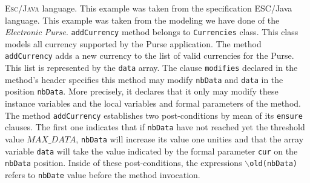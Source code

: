 \documentclass[a4paper]{llncs}
\begin{document}







\textsc{Esc/Java} language. This example was taken from the
specification ESC/Java language. This example was taken from the
modeling we have done of the \textit{Electronic
Purse}. \texttt{addCurrency} method belongs to \texttt{Currencies}
class. This class models all
currency supported by the Purse application. The method
\texttt{addCurrency} adds a new currency to the list of valid
currencies for the Purse. This list is represented by the
\texttt{data} array. The clause
\texttt{modifies} declared in the method's header specifies
this method may modify \texttt{nbData} and
\texttt{data} in the position \texttt{nbData}. More precisely, it
declares that it only may modify these instance variables and the local
variables and formal parameters of the method. The method
\texttt{addCurrency} establishes
two post-conditions by mean of its \texttt{ensure} clauses. The first
one indicates that if \texttt{nbData} have not reached yet the threshold
value $MAX\_DATA$, \texttt{nbData} will increase its value one
unities and that the array variable \texttt{data} will take the value
indicated by the formal parameter \texttt{cur} on the \texttt{nbData}
position. Inside of these post-conditions, the expressions
\texttt{$\backslash$old(nbData)} refers to \texttt{nbDate} value
before the method invocation.
\end{document}
